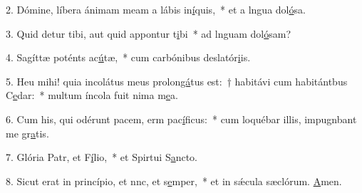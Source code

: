 2. Dómine, líbera ánimam meam a lábis in\uline{í}quis,~* et a lngua dol\uline{ó}sa.\par 
3. Quid detur tibi, aut quid appontur t\uline{i}bi~* ad lnguam dol\uline{ó}sam?\par 
4. Sagíttæ poténts ac\uline{ú}tæ,~* cum carbónibus deslatór\uline{i}is.\par 
5. Heu mihi! quia incolátus meus prolon\uline{gá}tus est:~† habitávi cum habitántbus C\uline{e}dar:~* multum íncola fuit nima m\uline{e}a.\par 
6. Cum his, qui odérunt pacem, erm pac\uline{í}ficus:~* cum loquébar illis, impugnbant me gr\uline{a}tis.\par 
7. Glória Patr, et F\uline{í}lio,~* et Spirtui S\uline{a}ncto.\par 
8. Sicut erat in princípio, et nnc, et s\uline{e}mper,~* et in sǽcula sæclórum. \uline{A}men.\par 

